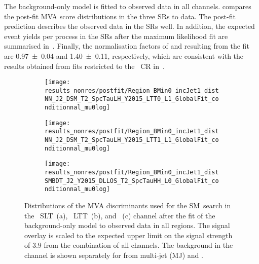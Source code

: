 The background-only model is fitted to observed data in all
channels.  compares the post-fit MVA score
distributions in the three SRs to data. The post-fit prediction describes the
observed data in the SRs well. In addition, the expected event yields per
process in the SRs after the maximum likelihood fit are summarised
in~. Finally, the normalisation factors of \ttbar
and \ZHF resulting from the fit are \num{0.97 +- 0.04} and \num{1.40 +- 0.11},
respectively, which are consistent with the results obtained from fits
restricted to the \ZHF~CR in~.

\begin{figure}[htbp]
  \centering

  \begin{subfigure}{0.495\textwidth}
    \centering

    \texttt{[image: results\_nonres/postfit/Region\_BMin0\_incJet1\_distNN\_J2\_DSM\_T2\_SpcTauLH\_Y2015\_LTT0\_L1\_GlobalFit\_conditionnal\_mu0log]}

  \end{subfigure}\hfill%
  \begin{subfigure}{0.495\textwidth}
    \centering

    \texttt{[image: results\_nonres/postfit/Region\_BMin0\_incJet1\_distNN\_J2\_DSM\_T2\_SpcTauLH\_Y2015\_LTT1\_L1\_GlobalFit\_conditionnal\_mu0log]}

  \end{subfigure}

  \vspace{0.5em}

  \begin{subfigure}{0.495\textwidth}
    \centering

    \texttt{[image: results\_nonres/postfit/Region\_BMin0\_incJet1\_distSMBDT\_J2\_Y2015\_DLLOS\_T2\_SpcTauHH\_L0\_GlobalFit\_conditionnal\_mu0log]}

  \end{subfigure}

  \caption[Distributions of the MVA discriminants used for the SM~\HH search
  after the background-only fit.]{Distributions of the MVA discriminants used
    for the SM~\HH search in the \lephad~SLT~(a), \lephad~LTT~(b), and
    \hadhad~(c) channel after the fit of the background-only model to observed
    data in all regions. The signal overlay is scaled to the expected upper
    limit on the signal strength of $3.9$ from the combination of all
    channels. The \faketauhadvisC background in the \hadhad channel is shown
    separately for \faketauhadvis from multi-jet (MJ) and \ttbar.}%
  \label{fig:mvascores_postfit}
\end{figure}


